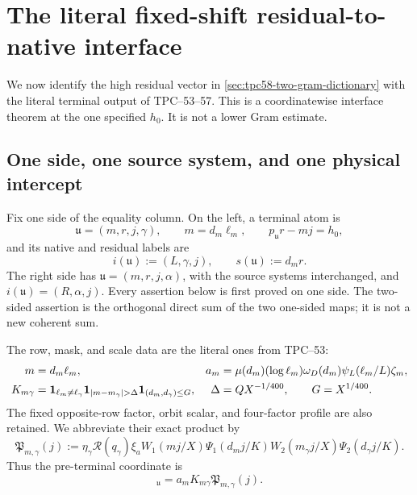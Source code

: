 \section{The literal fixed-shift residual-to-native interface}
\label{sec:tpc58-fixed-shift-interface}

We now identify the high residual vector in
\cref{sec:tpc58-two-gram-dictionary} with the literal terminal output of
TPC--53--57.  This is a coordinatewise interface theorem at the one
specified \(h_0\).  It is not a lower Gram estimate.

\subsection{One side, one source system, and one physical intercept}

Fix one side of the equality column.  On the left, a terminal atom is
\begin{equation}
 \mathfrak u=(m,r,j,\gamma),
 \qquad m=d_m\ell_m,
 \qquad p_{\mathfrak u}r-mj=h_0,
 \label{eq:tpc58-left-terminal-atom}
\end{equation}
and its native and residual labels are
\begin{equation}
 i(\mathfrak u):=(L,\gamma,j),
 \qquad s(\mathfrak u):=d_mr.
 \label{eq:tpc58-left-native-residual-labels}
\end{equation}
The right side has
\(\mathfrak u=(m,r,j,\alpha)\), with the source systems interchanged, and
\(i(\mathfrak u)=(R,\alpha,j)\).  Every assertion below is first proved on
one side.  The two-sided assertion is the orthogonal direct sum of the two
one-sided maps; it is not a new coherent sum.

The row, mask, and scale data are the literal ones from TPC--53:
\begin{align}
 m&=d_m\ell_m,
 &a_m&=\mu(d_m)(\log\ell_m)\omega_D(d_m)
       \psi_L(\ell_m/L)\zeta_m,
 \label{eq:tpc58-literal-source-row}\\
 K_{m\gamma}
 &=\one_{\ell_m\ne\ell_\gamma}
   \one_{|m-m_\gamma|>\Delta}
   \one_{(d_m,d_\gamma)\le G},
 &\Delta&=QX^{-1/400},\qquad G=X^{1/400}.
 \label{eq:tpc58-literal-mask-and-scales}
\end{align}
The fixed opposite-row factor, orbit scalar, and four-factor profile are
also retained.  We abbreviate their exact product by
\begin{equation}
 \mathfrak P_{m,\gamma}(j)
 :=\eta_\gamma\mathscr R(q_\gamma)\xi_a
   W_1(mj/X)\Psi_1(d_mj/K)
   W_2(m_\gamma j/X)\Psi_2(d_\gamma j/K).
 \label{eq:tpc58-literal-profile-product}
\end{equation}
Thus the pre-terminal coordinate is
\begin{equation}
 [G_X^L]_{\mathfrak u}
 =a_mK_{m\gamma}\mathfrak P_{m,\gamma}(j).
 \label{eq:tpc58-literal-preterminal-coordinate}
\end{equation}

